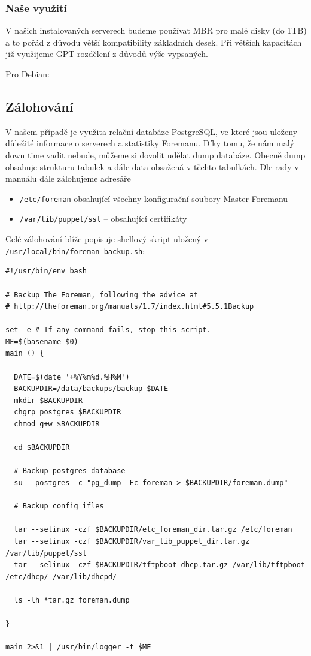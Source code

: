 \documentclass[thesis=B,czech]{FITthesis}[2012/06/26]
\begin{document}
\subsubsection{Naše využití}


V našich instalovaných serverech budeme používat MBR pro malé disky (do 1TB) a to pořád z důvodu větší kompatibility základních desek. Při větších kapacitách již využijeme GPT rozdělení z důvodů výše vypsaných.

Pro Debian:



\subsection{Zálohování}

V našem případě je využita relační databáze PostgreSQL, ve které jsou uloženy důležité informace o serverech a statistiky Foremanu. Díky tomu, že nám malý down time vadit nebude, můžeme si dovolit udělat dump databáze. Obecně dump obsahuje strukturu tabulek a dále data obsažená v těchto tabulkách. Dle rady v manuálu \cite{foreman-backup} dále zálohujeme adresáře

\begin{itemize}
\item \texttt{/etc/foreman} obsahující všechny konfigurační soubory Master Foremanu
\item \texttt{/var/lib/puppet/ssl} -- obsahující certifikáty
\end{itemize}

Celé zálohování blíže popisuje shellový skript uložený v \texttt{/usr/local/bin/foreman-backup.sh}:
\begin{verbatim}
#!/usr/bin/env bash

# Backup The Foreman, following the advice at
# http://theforeman.org/manuals/1.7/index.html#5.5.1Backup

set -e # If any command fails, stop this script.
ME=$(basename $0)
main () {

  DATE=$(date '+%Y%m%d.%H%M')
  BACKUPDIR=/data/backups/backup-$DATE
  mkdir $BACKUPDIR
  chgrp postgres $BACKUPDIR
  chmod g+w $BACKUPDIR

  cd $BACKUPDIR

  # Backup postgres database
  su - postgres -c "pg_dump -Fc foreman > $BACKUPDIR/foreman.dump"

  # Backup config ifles

  tar --selinux -czf $BACKUPDIR/etc_foreman_dir.tar.gz /etc/foreman
  tar --selinux -czf $BACKUPDIR/var_lib_puppet_dir.tar.gz /var/lib/puppet/ssl
  tar --selinux -czf $BACKUPDIR/tftpboot-dhcp.tar.gz /var/lib/tftpboot /etc/dhcp/ /var/lib/dhcpd/

  ls -lh *tar.gz foreman.dump

}

main 2>&1 | /usr/bin/logger -t $ME
\end{verbatim}
\end{document}
